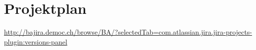 \chapter{Projektplan}
	\hyperlink{http://bajira.democ.ch/browse/BA/?selectedTab=com.atlassian.jira.jira-projects-plugin:versions-panel}{http://bajira.democ.ch/browse/BA/?selectedTab=com.atlassian.jira.jira-projects-plugin:versions-panel}
